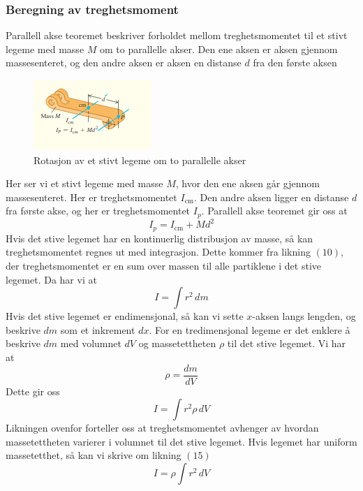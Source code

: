 \subsubsection{Beregning av treghetsmoment}
Parallell akse teoremet beskriver forholdet mellom treghetsmomentet til et stivt legeme med masse $M$ om to parallelle akser. Den ene aksen er aksen gjennom massesenteret, og den andre aksen er aksen en distanse $d$ fra den første aksen
\begin{figure}[!ht]
\begin{center}
\includegraphics{rapport/teori/bilder/parallell.png}
\caption{Rotasjon av et stivt legeme om to parallelle akser}
\label{fig:rotasjon}
\end{center}
\end{figure}\newline\newline
Her ser vi et stivt legeme med masse $M$, hvor den ene aksen går gjennom massesenteret. Her er treghetsmomentet $I_\text{cm}$. Den andre aksen ligger en distanse $d$ fra første akse, og her er treghetsmomentet $I_p.$\cite{FYSIKK:1} Parallell akse teoremet gir oss at
\begin{equation}
    I_p=I_\text{cm}+Md^2
\end{equation}
Hvis det stive legemet har en kontinuerlig distribusjon av masse, så kan treghetsmomentet regnes ut med integrasjon. Dette kommer fra likning $(10)$, der treghetsmomentet er en sum over massen til alle partiklene i det stive legemet. Da har vi at
\begin{equation}
    I=\int{r^2\,dm}
\end{equation}
Hvis det stive legemet er endimensjonal, så kan vi sette $x$-aksen langs lengden, og beskrive $dm$ som et inkrement $dx.$ For en tredimensjonal legeme er det enklere å beskrive $dm$ med volumnet $dV$ og massetettheten $\rho$ til det stive legemet. Vi har at
\begin{equation}
    \rho=\frac{dm}{dV}
\end{equation}
Dette gir oss
\begin{equation}
    I=\int{r^2\rho\,dV}
\end{equation}
Likningen ovenfor forteller oss at treghetsmomentet avhenger av hvordan massetettheten varierer i volumnet til det stive legemet. Hvis legemet har uniform massetetthet, så kan vi skrive om likning $(15)$
\begin{equation}
    I=\rho\int{r^2\,dV}
\end{equation}
